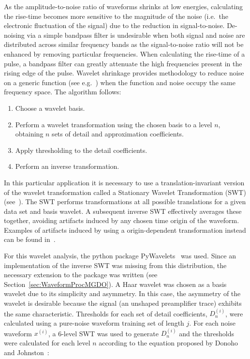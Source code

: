 	As the amplitude-to-noise ratio of waveforms shrinks at low energies, calculating the rise-time becomes more sensitive to the magnitude of the noise (i.e.~the electronic fluctuation of the signal) due to the reduction in signal-to-noise.   De-noising via a simple bandpass filter is undesirable when both signal and noise are distributed across similar frequency bands as the signal-to-noise ratio will not be enhanced by removing particular frequencies.  When calculating the rise-time of a pulse, a bandpass filter can greatly attenuate the high frequencies present in the rising edge of the pulse.  Wavelet shrinkage provides methodology to reduce noise on a generic function (see e.g.~\cite{Don95bb,Don95aa}) when the function and noise occupy the same frequency space.  The algorithm follows:
				\begin{enumerate}
					\item Choose a wavelet basis.
					\item Perform a wavelet transformation using the chosen basis to a level $n$, 
					obtaining $n$ sets of detail and approximation coefficients.
					\item Apply thresholding to the detail coefficients.
					\item Perform an inverse transformation.
				\end{enumerate}
	In this particular application it is necessary to use a translation-invariant version of the wavelet transformation called a Stationary Wavelet Transformation (SWT) (see~\cite{Coif95aa,Naso95aa}).  The SWT performs transformations at all possible translations for a given data set and basis wavelet.  A subsequent inverse SWT effectively averages these together, avoiding artifacts induced by any chosen time origin of the waveform.  Examples of artifacts induced by using a origin-dependent transformation instead can be found in~\cite{Coif95aa,Naso95aa}.
	
	For this wavelet analysis, the python package PyWavelets~\cite{PyWave} was used.  Since an implementation of the inverse SWT was missing from this distribution, the necessary extension to the package was written (see Section~\ref{sec:WaveformProcMGDO}).  A Haar wavelet was chosen as a basis wavelet due to its simplicity and asymmetry.  In this case, the asymmetry of the wavelet is desirable because the signal (an unshaped preamplifier trace) exhibits the same characteristic.  Thresholds for each set of detail coefficients, $D_{n}^{(i)}$, were calculated using a pure-noise waveform training set of length $j$.  For each noise waveform $x^{(i)}$, a 6-level SWT was used to generate $D_{n}^{(i)}$ and the thresholds were calculated for each level $n$ according to the equation proposed by Donoho and Johnston~\cite{Don95ad}:
	
